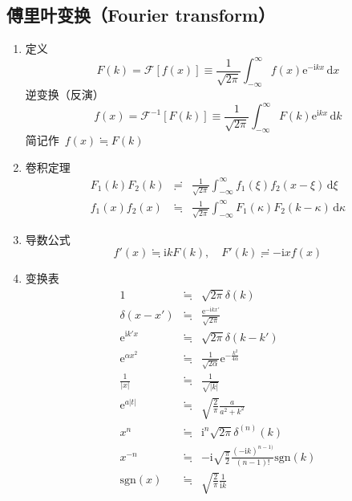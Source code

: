 \documentclass[12pt,a4paper]{article}
\newcommand\diff{\,\mathrm{d}}
\renewcommand{\[}{\ $\displaystyle}
\renewcommand{\]}{$\ }%
\newcommand\mi{\mathrm{i}}
\newcommand\e{\mathrm{e}}
\begin{document}
	\subsection{傅里叶变换（Fourier transform）}
	  \begin{enumerate}
	  	\item 定义
	  		 $$
	  		   F(k) = \mathscr{F}[f(x)] \equiv \frac 1{\sqrt{2\pi}}\int_{-\infty}^\infty f(x)\e^{-\mi kx}\diff x
	  		 $$
	  		 逆变换（反演）
	  		 $$
	  		   f(x) = \mathscr{F}^{-1}[F(k)]\equiv \frac 1{\sqrt{2\pi}}\int_{-\infty}^{\infty}F(k)\e^{\mi kx}\diff k
	  		 $$
	  		 简记作\[f(x)\fallingdotseq F(k)\]
	  	\item 卷积定理
	  		\begin{eqnarray*}
	  		  F_1(k)F_2(k) &\risingdotseq & \frac 1{\sqrt{2\pi}}\int_{-\infty}^{\infty}f_1(\xi)f_2(x-\xi)\diff\xi \\
	  		  f_1(x)f_2(x) &\fallingdotseq & \frac 1{\sqrt{2\pi}}\int_{-\infty}^{\infty}F_1(\kappa)F_2(k-\kappa)\diff\kappa
	  		\end{eqnarray*}
	  	\item 导数公式
	  	$$f'(x)\fallingdotseq \mi kF(k),\quad F'(k)\risingdotseq -\mi xf(x)$$
	  	\item  变换表
	  		\begin{eqnarray*}
	  		  1 &\fallingdotseq & \sqrt{2\pi}\delta(k) \\
	  		  \delta(x-x') &\fallingdotseq & \frac{\e^{-\mi kx'}}{\sqrt{2\pi}} \\
	  		  \e^{\mi k'x}&\fallingdotseq & \sqrt{2\pi}\delta(k-k') \\
	  		  \e^{\alpha x^2} &\fallingdotseq & \frac{1}{\sqrt{2\alpha}}\e^{-\frac{k^2}{4\alpha}}
	  		  \\
	  		  \frac{1}{|x|} &\fallingdotseq & \frac{1}{\sqrt{|k|}} \\
	  		  \e^{a|t|} &\fallingdotseq & \sqrt{\frac{2}{\pi}}\frac{a}{a^2+k^2} \\
	  		  x^n &\fallingdotseq & \mi^n\sqrt{2\pi}\delta^{(n)}(k) \\
	  		  x^{-n} &\fallingdotseq & -\mi\sqrt{\frac{\pi}{2}}\frac{(-\mi k)^{n-1)}}{(n-1)!}\mathrm{sgn}(k)\\
	  		  \mathrm{sgn}(x) &\fallingdotseq & \sqrt{\frac 2\pi}\frac{1}{\mi k}
	  		\end{eqnarray*}
	  \end{enumerate}
	
\end{document}
